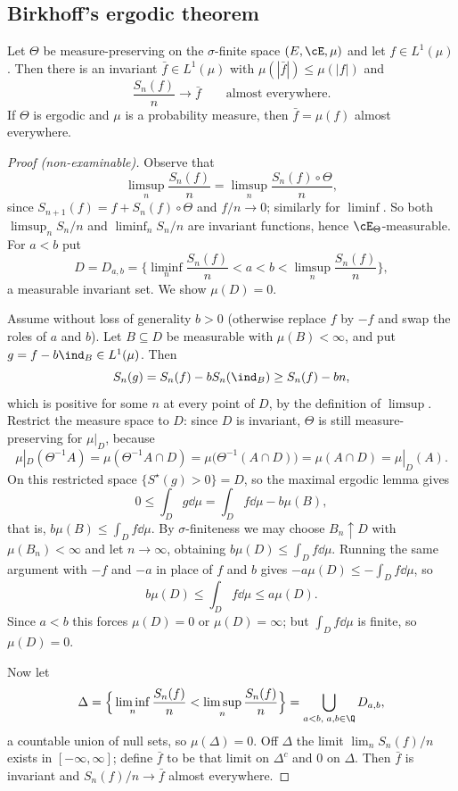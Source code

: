 \subsection{Birkhoff's ergodic theorem}

\begin{theorem}[Birkhoff]\label{thm:birkhoff}
	Let $\Theta$ be measure-preserving on the $\sigma$-finite space $(E,\cE,\mu)$ and let $f \in L^1(\mu)$. Then there is an invariant $\bar f \in L^1(\mu)$ with $\mu(|\bar f|)\leq\mu(|f|)$ and
	$$
	\frac{S_n(f)}{n}\longrightarrow\bar f \qquad \text{almost everywhere.}
	$$
	If $\Theta$ is ergodic and $\mu$ is a probability measure, then $\bar f = \mu(f)$ almost everywhere.
\end{theorem}
\begin{proof}[Proof (non-examinable)]
	Observe that
	$$
	\limsup_n \frac{S_n(f)}{n} = \limsup_n \frac{S_n(f)\circ\Theta}{n},
	$$
	since $S_{n+1}(f) = f + S_n(f)\circ\Theta$ and $f/n \to 0$; similarly for $\liminf$. So both $\limsup_n S_n/n$ and $\liminf_n S_n/n$ are invariant functions, hence $\cE_\Theta$-measurable. For $a<b$ put
	$$
	D = D_{a,b}=\Big\{\liminf_n \frac{S_n(f)}{n}<a<b<\limsup_n\frac{S_n(f)}{n}\Big\},
	$$
	a measurable invariant set. We show $\mu(D)=0$.

	Assume without loss of generality $b>0$ (otherwise replace $f$ by $-f$ and swap the roles of $a$ and $b$). Let $B \subseteq D$ be measurable with $\mu(B)<\infty$, and put $g = f - b\ind_B \in L^1(\mu)$. Then
	$$
	S_n(g) = S_n(f)-bS_n(\ind_B) \geq S_n(f)-bn,
	$$
	which is positive for some $n$ at every point of $D$, by the definition of $\limsup$. Restrict the measure space to $D$: since $D$ is invariant, $\Theta$ is still measure-preserving for $\mu|_D$, because
	$$
	\mu|_D(\Theta^{-1}A)=\mu(\Theta^{-1}A \cap D) = \mu\big(\Theta^{-1}(A\cap D)\big)=\mu(A\cap D)=\mu|_D(A).
	$$
	On this restricted space $\{S^\star(g)>0\}=D$, so the maximal ergodic lemma gives
	$$
	0 \leq \int_D g\dd\mu = \int_D f\dd\mu - b\mu(B),
	$$
	that is, $b\mu(B)\leq \int_D f\dd\mu$. By $\sigma$-finiteness we may choose $B_n \uparrow D$ with $\mu(B_n)<\infty$ and let $n \to\infty$, obtaining $b\mu(D)\leq\int_Df\dd\mu$. Running the same argument with $-f$ and $-a$ in place of $f$ and $b$ gives $-a\mu(D)\leq -\int_Df\dd\mu$, so
	$$
	b\mu(D)\leq\int_D f\dd\mu\leq a\mu(D).
	$$
	Since $a<b$ this forces $\mu(D)=0$ or $\mu(D)=\infty$; but $\int_D f\dd\mu$ is finite, so $\mu(D)=0$.

	Now let
	$$
	\Delta = \Big\{\liminf_n\frac{S_n(f)}{n}<\limsup_n\frac{S_n(f)}{n}\Big\}=\bigcup_{a<b,\; a,b\in\Q}D_{a,b},
	$$
	a countable union of null sets, so $\mu(\Delta)=0$. Off $\Delta$ the limit $\lim_n S_n(f)/n$ exists in $[-\infty,\infty]$; define $\bar f$ to be that limit on $\Delta^c$ and $0$ on $\Delta$. Then $\bar f$ is invariant and $S_n(f)/n\to\bar f$ almost everywhere.


\end{proof}
